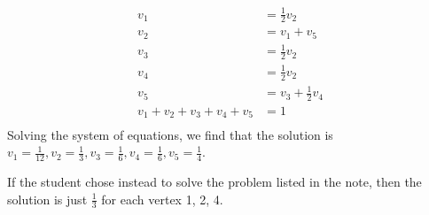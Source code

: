 \documentclass[12pt,twoside]{article}
\begin{document}
\begin{problem}{10}
\begin{problem}{15}
{\begin{equation}
\begin{split}
v_1 &= \frac{1}{2}v_2 \\
v_2 &= v_1 + v_5 \\
v_3 &= \frac{1}{2}v_2 \\
v_4 &= \frac{1}{2}v_2 \\
v_5 &= v_3 + \frac{1}{2}v_4 \\
v_1 + v_2 + v_3 + v_4 + v_5 &= 1 \\
\end{split}
\end{equation}
Solving the system of equations, we find that the solution is $v_1 = \frac{1}{12}, v_2 = \frac{1}{3}, v_3 = \frac{1}{6}, v_4 = \frac{1}{6}, v_5 = \frac{1}{4}$.


If the student chose instead to solve the problem listed in the note, then the solution is just $\frac{1}{3}$ for each vertex 1, 2, 4.  

}


\eparts
\end{problem}

\eparts
\end{problem}



\newpage

\end{document}
